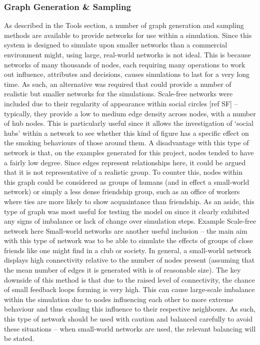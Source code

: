 \documentclass[]{report}
\begin{document}
\subsubsection{Graph Generation \& Sampling}
As described in the Tools section, a number of graph generation and sampling methods are available to provide networks for use within a simulation. Since this system is designed to simulate upon smaller networks than a commercial environment might, using large, real-world networks is not ideal. This is because networks of many thousands of nodes, each requiring many operations to work out influence, attributes and decisions, causes simulations to last for a very long time. As such, an alternative was required that could provide a number of realistic but smaller networks for the simulations.
Scale-free networks were included due to their regularity of appearance within social circles [ref SF] – typically, they provide a low to medium edge density across nodes, with a number of hub nodes. This is particularly useful since it allows the investigation of `social hubs' within a network to see whether this kind of figure has a specific effect on the smoking behaviours of those around them. A disadvantage with this type of network is that, on the examples generated for this project, nodes tended to have a fairly low degree. Since edges represent relationships here, it could be argued that it is not representative of a realistic group. To counter this, nodes within this graph could be considered as groups of humans (and in effect a small-world network) or simply a less dense friendship group, such as an office of workers where ties are more likely to show acquaintance than friendship. As an aside, this type of graph was most useful for testing the model on since it clearly exhibited any signs of imbalance or lack of change over simulation steps.
Example Scale-free network here
Small-world networks are another useful inclusion – the main aim with this type of network was to be able to simulate the effects of groups of close friends like one might find in a club or society. In general, a small-world network displays high connectivity relative to the number of nodes present (assuming that the mean number of edges it is generated with is of reasonable size). The key downside of this method is that due to the raised level of connectivity, the chance of small feedback loops forming is very high. This can cause large-scale imbalance within the simulation due to nodes influencing each other to more extreme behaviour and thus exuding this influence to their respective neighbours. As such, this type of network should be used with caution and balanced carefully to avoid these situations – when small-world networks are used, the relevant balancing will be stated.
\end{document}
